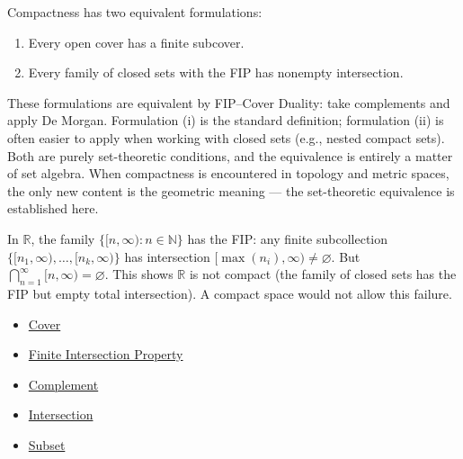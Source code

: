 \begin{remark*}[Exposition]
Compactness has two equivalent formulations:
\begin{enumerate}[label=(\roman*)]
\item Every open cover has a finite subcover.
\item Every family of closed sets with the FIP has nonempty intersection.
\end{enumerate}
These formulations are equivalent by FIP--Cover Duality: take complements and
apply De Morgan. Formulation (i) is the standard definition; formulation (ii)
is often easier to apply when working with closed sets (e.g., nested compact
sets). Both are purely set-theoretic conditions, and the equivalence is
entirely a matter of set algebra. When compactness is encountered in topology
and metric spaces, the only new content is the geometric meaning --- the
set-theoretic equivalence is established here.
\end{remark*}

\begin{remark*}[Exposition]
In $\mathbb{R}$, the family $\{[n, \infty) : n \in \mathbb{N}\}$ has the FIP:
any finite subcollection $\{[n_1,\infty), \dots, [n_k,\infty)\}$ has
intersection $[\max(n_i), \infty) \neq \varnothing$. But
$\bigcap_{n=1}^\infty [n, \infty) = \varnothing$. This shows $\mathbb{R}$ is
not compact (the family of closed sets has the FIP but empty total
intersection). A compact space would not allow this failure.
\end{remark*}

\begin{dependencies}
\begin{itemize}
  \item \hyperref[def:cover-full]{Cover}
  \item \hyperref[def:fip]{Finite Intersection Property}
  \item \hyperref[def:complement]{Complement}
  \item \hyperref[def:intersection]{Intersection}
  \item \hyperref[def:subset]{Subset}
\end{itemize}
\end{dependencies}
